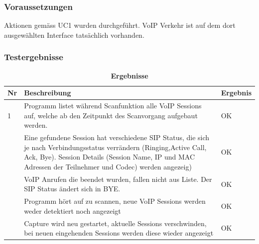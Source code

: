 \documentclass[a4,12pt]{scrartcl}
\begin{document}
\subsubsection{Voraussetzungen}
Aktionen gemäss UC1 wurden durchgeführt. VoIP Verkehr ist auf dem dort ausgewählten Interface tatsächlich vorhanden.

\subsubsection{Testergebnisse}
\begin{table}[H]
\centering
    \begin{tabular}{@{} p{0.5cm} p{11cm} p{2cm} @{}}\toprule    
    {Nr} & {Beschreibung} & {Ergebnis}\\ \midrule
    1 & Programm listet während Scanfunktion alle VoIP Sessions auf, welche ab den Zeitpunkt des Scanvorgang aufgebaut werden. & OK\\ \addlinespace
   	2 & Eine gefundene Session hat verschiedene SIP Status, die sich je nach Verbindungsstatus verrändern (Ringing,Active Call, Ack, Bye). Session Details (Session Name, IP und MAC Adressen der Teilnehmer und Codec) werden angezeig) & OK\\ \addlinespace
    3 & VoIP Anrufen die beendet wurden, fallen nicht aus Liste. Der SIP Status ändert sich in BYE. & OK\\ \addlinespace
    4 & Programm hört auf zu scannen, neue VoIP Sessions werden weder detektiert noch angezeigt & OK\\ \addlinespace
    5 & Capture wird neu gestartet, aktuelle Sessions verschwinden, bei neuen eingehenden Sessions werden diese wieder angezeigt & OK\\
    \bottomrule
    \end{tabular}
\caption{\textbf{Ergebnisse}}
\end{table}
\newpage
\end{document}
